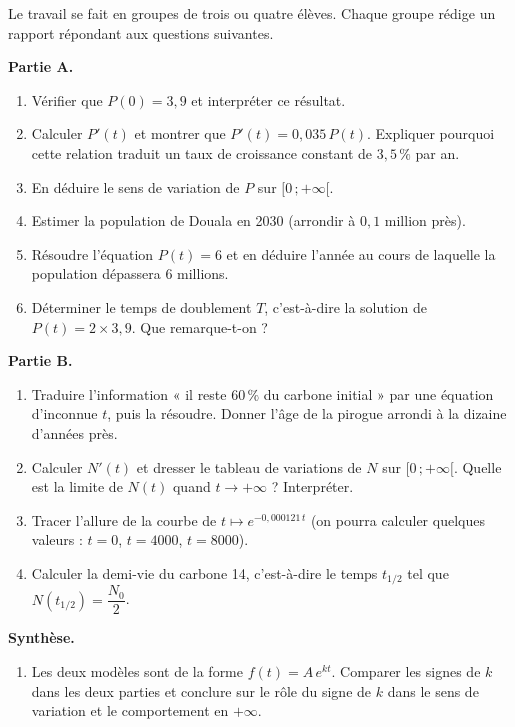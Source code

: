 \documentclass[11pt]{article}
\newcounter{popsec}
\newcounter{popsub}
\newcommand{\courssub}[1]{%
  \stepcounter{popsub}%
  \par\vspace{9pt}\noindent{\popxbold\fontsize{11.5}{13}\selectfont\color{popink}{\color{poporange}\thepopsec.\thepopsub}\hspace{6pt}#1}\par\nopagebreak\vspace{4pt}
}
\begin{document}
\courssub{Consignes}

Le travail se fait en groupes de trois ou quatre élèves. Chaque groupe rédige un rapport répondant aux questions suivantes.

\textbf{Partie A.}
\begin{enumerate}
\item Vérifier que $P(0) = 3,9$ et interpréter ce résultat.
\item Calculer $P'(t)$ et montrer que $P'(t) = 0,035\,P(t)$. Expliquer pourquoi cette relation traduit un taux de croissance constant de $3,5\,\%$ par an.
\item En déduire le sens de variation de $P$ sur $[0\,;+\infty[$.
\item Estimer la population de Douala en 2030 (arrondir à $0,1$ million près).
\item Résoudre l'équation $P(t) = 6$ et en déduire l'année au cours de laquelle la population dépassera $6$ millions.
\item Déterminer le temps de doublement $T$, c'est-à-dire la solution de $P(t) = 2 \times 3,9$. Que remarque-t-on ?
\end{enumerate}

\textbf{Partie B.}
\begin{enumerate}
\item[7.] Traduire l'information « il reste $60\,\%$ du carbone initial » par une équation d'inconnue $t$, puis la résoudre. Donner l'âge de la pirogue arrondi à la dizaine d'années près.
\item[8.] Calculer $N'(t)$ et dresser le tableau de variations de $N$ sur $[0\,;+\infty[$. Quelle est la limite de $N(t)$ quand $t \to +\infty$ ? Interpréter.
\item[9.] Tracer l'allure de la courbe de $t \mapsto e^{-0,000121\,t}$ (on pourra calculer quelques valeurs : $t = 0$, $t = 4000$, $t = 8000$).
\item[10.] Calculer la demi-vie du carbone 14, c'est-à-dire le temps $t_{1/2}$ tel que $N(t_{1/2}) = \dfrac{N_0}{2}$.
\end{enumerate}

\textbf{Synthèse.}
\begin{enumerate}
\item[11.] Les deux modèles sont de la forme $f(t) = A\,e^{kt}$. Comparer les signes de $k$ dans les deux parties et conclure sur le rôle du signe de $k$ dans le sens de variation et le comportement en $+\infty$.
\end{enumerate}
\end{document}
